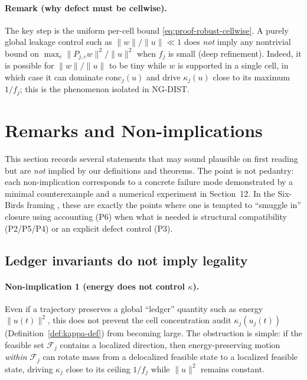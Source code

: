 \documentclass[11pt]{article}
\newcommand{\conc}{\mathrm{conc}}
\begin{document}
\paragraph{Remark (why defect must be cellwise).}
The key step is the uniform per-cell bound \eqref{eq:proof-robust-cellwise}.
A purely global leakage control such as $\|w\|/\|u\|\ll 1$ does \emph{not} imply any nontrivial bound on $\max_c\|P_{j,c}w\|^2/\|u\|^2$ when $f_j$ is small (deep refinement).
Indeed, it is possible for $\|w\|/\|u\|$ to be tiny while $w$ is supported in a single cell, in which case it can dominate $\conc_j(u)$ and drive $\kappa_j(u)$ close to its maximum $1/f_j$; this is the phenomenon isolated in NG-DIST.
 \section{Remarks and Non-implications}\label{sec:nonimplications}

This section records several statements that may sound plausible on first reading but are \emph{not} implied by our definitions and theorems.
The point is not pedantry: each non-implication corresponds to a concrete failure mode demonstrated by a minimal counterexample and a numerical experiment in Section~12.
In the Six-Birds framing \cite{Tsiokos2026SixBirds}, these are exactly the points where one is tempted to ``smuggle in'' closure using accounting (P6) when what is needed is structural compatibility (P2/P5/P4) or an explicit defect control (P3).

\subsection{Ledger invariants do not imply legality}

\paragraph{Non-implication 1 (energy does not control $\kappa$).}
Even if a trajectory preserves a global ``ledger'' quantity such as energy $\|u(t)\|^2$, this does not prevent the cell concentration audit $\kappa_j(u_j(t))$ (Definition~\ref{def:kappa-def}) from becoming large.
The obstruction is simple: if the feasible set $\mathcal{F}_j$ contains a localized direction, then energy-preserving motion \emph{within} $\mathcal{F}_j$ can rotate mass from a delocalized feasible state to a localized feasible state, driving $\kappa_j$ close to its ceiling $1/f_j$ while $\|u\|^2$ remains constant.
\end{document}
